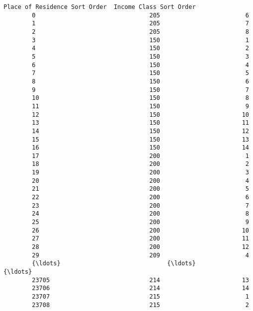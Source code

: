 \documentclass[11pt]{article}
\begin{document}
\begin{Verbatim}[commandchars=\\\{\}]
               Place of Residence Sort Order  Income Class Sort Order  
        0                                205                        6  
        1                                205                        7  
        2                                205                        8  
        3                                150                        1  
        4                                150                        2  
        5                                150                        3  
        6                                150                        4  
        7                                150                        5  
        8                                150                        6  
        9                                150                        7  
        10                               150                        8  
        11                               150                        9  
        12                               150                       10  
        13                               150                       11  
        14                               150                       12  
        15                               150                       13  
        16                               150                       14  
        17                               200                        1  
        18                               200                        2  
        19                               200                        3  
        20                               200                        4  
        21                               200                        5  
        22                               200                        6  
        23                               200                        7  
        24                               200                        8  
        25                               200                        9  
        26                               200                       10  
        27                               200                       11  
        28                               200                       12  
        29                               209                        4  
        {\ldots}                              {\ldots}                      {\ldots}  
        23705                            214                       13  
        23706                            214                       14  
        23707                            215                        1  
        23708                            215                        2  

\end{Verbatim}
\end{document}
